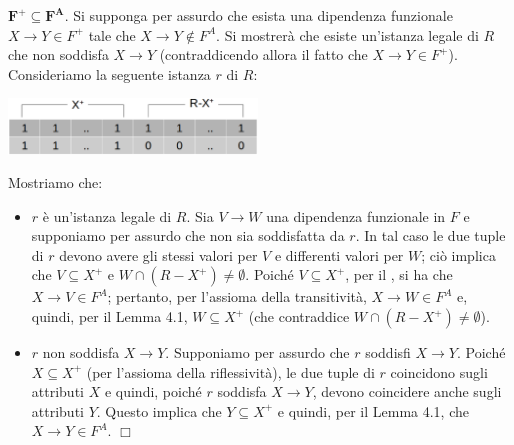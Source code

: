 $\mathbf{F^{\boldsymbol{+}} \boldsymbol{\subseteq} F^{A}}$. Si supponga per assurdo che esista una dipendenza 
funzionale $X \rightarrow Y \in F^+$ tale che $X \rightarrow Y \not\in F^A$. Si mostrerà che esiste 
un'istanza legale di $R$ che non soddisfa $X \rightarrow Y$ (contraddicendo allora il fatto che $X \rightarrow Y 
\in F^+$).\\
Consideriamo la seguente istanza $r$ di $R$:
\begin{center}
\includegraphics[width=250px]{img_4_4_2.eps} 
\end{center}
Mostriamo che:
\begin{itemize}
 \item $r$ è un'istanza legale di $R$. Sia $V \rightarrow W$ una dipendenza funzionale in $F$ e supponiamo
 per assurdo che non sia soddisfatta da $r$. In tal caso le due tuple di $r$ devono avere gli stessi valori
 per $V$ e differenti valori per $W$; ciò implica che $V \subseteq X^+$ e $W \cap (R-X^+)\not = \emptyset$.
 Poiché $V \subseteq X^+$, per il , si ha che $X \rightarrow V \in F^A$; pertanto,
 per l'assioma della transitività, $X \rightarrow W \in F^A$ e, quindi, per il Lemma 4.1,
 $W \subseteq X^+$ (che contraddice $W \cap (R-X^+)\not =\emptyset$).
 \item $r$ non soddisfa $X \rightarrow Y$. Supponiamo per assurdo che $r$ soddisfi $X \rightarrow Y$. Poiché 
 $X \subseteq X^+$ (per l'assioma della riflessività), le due tuple di $r$ coincidono sugli attributi $X$ 
 e quindi, poiché $r$ soddisfa $X \rightarrow Y$, devono coincidere anche sugli attributi $Y$. Questo implica
 che $Y \subseteq X^+$ e quindi, per il Lemma 4.1, che $X \rightarrow Y \in F^A$. \hfill $\Box$
\end{itemize}

